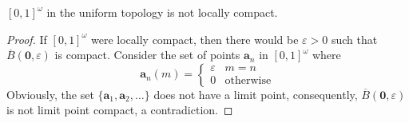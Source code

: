 \begin{proposition}
    $[0,1]^\omega$ in the uniform topology is not locally compact.
\end{proposition}
\begin{proof}
    If $[0,1]^\omega$ were locally compact, then there would be $\varepsilon > 0$ such that $\overline B(\mathbf 0,\varepsilon)$ is compact. Consider the set of points $\mathbf a_n$ in $[0,1]^\omega$ where 
    \begin{equation*}
        \mathbf a_n(m) = 
        \begin{cases}
            \varepsilon & m = n\\
            0 & \text{otherwise}
        \end{cases}
    \end{equation*}
    Obviously, the set $\{\mathbf a_1,\mathbf a_2,\ldots\}$ does not have a limit point, consequently, $\overline B(\mathbf 0, \varepsilon)$ is not limit point compact, a contradiction.
\end{proof}